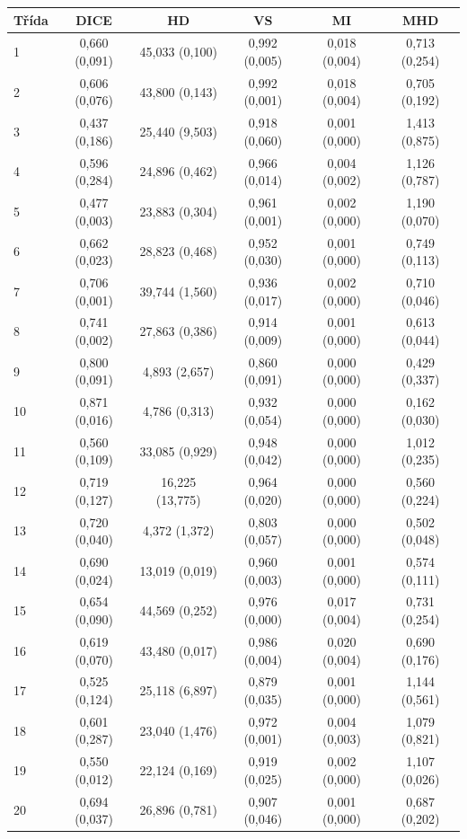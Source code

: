 \begin{tabular}{l c c c c c}
 \hline
Třída & DICE & HD & VS & MI & MHD \\ \hline
1 & 0,660 (0,091) & 45,033 (0,100) & 0,992 (0,005) & 0,018 (0,004) & 0,713 (0,254) \\
2 & 0,606 (0,076) & 43,800 (0,143) & 0,992 (0,001) & 0,018 (0,004) & 0,705 (0,192) \\
3 & 0,437 (0,186) & 25,440 (9,503) & 0,918 (0,060) & 0,001 (0,000) & 1,413 (0,875) \\
4 & 0,596 (0,284) & 24,896 (0,462) & 0,966 (0,014) & 0,004 (0,002) & 1,126 (0,787) \\
5 & 0,477 (0,003) & 23,883 (0,304) & 0,961 (0,001) & 0,002 (0,000) & 1,190 (0,070) \\
6 & 0,662 (0,023) & 28,823 (0,468) & 0,952 (0,030) & 0,001 (0,000) & 0,749 (0,113) \\
7 & 0,706 (0,001) & 39,744 (1,560) & 0,936 (0,017) & 0,002 (0,000) & 0,710 (0,046) \\
8 & 0,741 (0,002) & 27,863 (0,386) & 0,914 (0,009) & 0,001 (0,000) & 0,613 (0,044) \\
9 & 0,800 (0,091) & 4,893 (2,657) & 0,860 (0,091) & 0,000 (0,000) & 0,429 (0,337) \\
10 & 0,871 (0,016) & 4,786 (0,313) & 0,932 (0,054) & 0,000 (0,000) & 0,162 (0,030) \\
11 & 0,560 (0,109) & 33,085 (0,929) & 0,948 (0,042) & 0,000 (0,000) & 1,012 (0,235) \\
12 & 0,719 (0,127) & 16,225 (13,775) & 0,964 (0,020) & 0,000 (0,000) & 0,560 (0,224) \\
13 & 0,720 (0,040) & 4,372 (1,372) & 0,803 (0,057) & 0,000 (0,000) & 0,502 (0,048) \\
14 & 0,690 (0,024) & 13,019 (0,019) & 0,960 (0,003) & 0,001 (0,000) & 0,574 (0,111) \\
15 & 0,654 (0,090) & 44,569 (0,252) & 0,976 (0,000) & 0,017 (0,004) & 0,731 (0,254) \\
16 & 0,619 (0,070) & 43,480 (0,017) & 0,986 (0,004) & 0,020 (0,004) & 0,690 (0,176) \\
17 & 0,525 (0,124) & 25,118 (6,897) & 0,879 (0,035) & 0,001 (0,000) & 1,144 (0,561) \\
18 & 0,601 (0,287) & 23,040 (1,476) & 0,972 (0,001) & 0,004 (0,003) & 1,079 (0,821) \\
19 & 0,550 (0,012) & 22,124 (0,169) & 0,919 (0,025) & 0,002 (0,000) & 1,107 (0,026) \\
20 & 0,694 (0,037) & 26,896 (0,781) & 0,907 (0,046) & 0,001 (0,000) & 0,687 (0,202) \\

\end{tabular}

